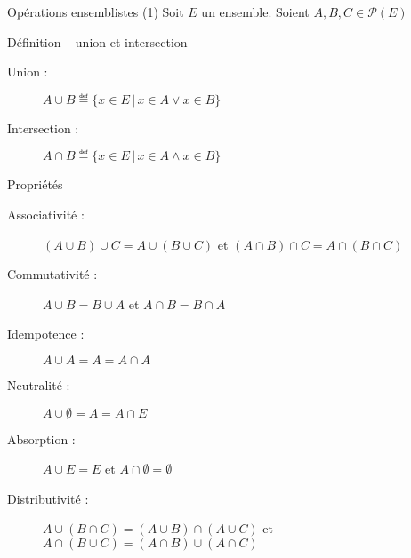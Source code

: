 
\begingroup


\begin{frame}{Opérations ensemblistes (1)}
  Soit $E$ un ensemble. Soient $A, B, C \in \mathscr{P}(E)$
  \begin{block}{Définition -- union et intersection}
    \begin{description}
    \item[Union :] $A \cup B \eqdef \{x \in E \,|\, x \in A \lor x \in B\}$
    \item[Intersection :] $A \cap B \eqdef \{x \in E \,|\, x \in A \land x \in B\}$
    \end{description}
  \end{block}
  \begin{block}{Propriétés}
    \begin{description}
    \item[Associativité :] \alert{$(A \cup B) \cup C = A \cup (B \cup C)$} et \alert{$(A \cap B) \cap C = A \cap (B \cap C)$}
    \item[Commutativité :] \alert{$A \cup B = B \cup A$} et \alert{$A \cap B = B \cap A$}
    \item[Idempotence :] \alert{$A \cup A = A = A \cap A$}
    \item[Neutralité :] \alert{$A \cup \emptyset = A = A \cap E$}
    \item[Absorption :] \alert{$A \cup E = E$} et \alert{$A \cap \emptyset = \emptyset$}
    \item[Distributivité :] \alert{$A \cup (B \cap C) = (A \cup B) \cap (A \cup C)$} et \alert{$A \cap (B \cup C) = (A \cap B) \cup (A \cap C)$}
    \end{description}
  \end{block}
\end{frame}
\endgroup

